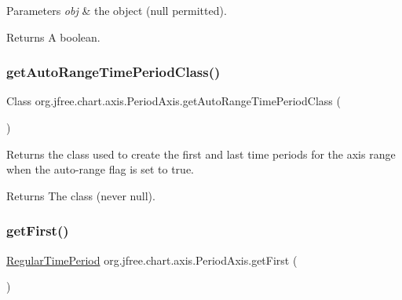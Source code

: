 \begin{DoxyParams}{Parameters}
{\em obj} & the object ({\ttfamily null} permitted).\\
\hline
\end{DoxyParams}
\begin{DoxyReturn}{Returns}
A boolean. 
\end{DoxyReturn}
\mbox{\label{classorg_1_1jfree_1_1chart_1_1axis_1_1_period_axis_abd775d70847623310012a3d2c8e4af31}} 
\subsubsection{\texorpdfstring{get\+Auto\+Range\+Time\+Period\+Class()}{getAutoRangeTimePeriodClass()}}
{\footnotesize\ttfamily Class org.\+jfree.\+chart.\+axis.\+Period\+Axis.\+get\+Auto\+Range\+Time\+Period\+Class (\begin{DoxyParamCaption}{ }\end{DoxyParamCaption})}

Returns the class used to create the first and last time periods for the axis range when the auto-\/range flag is set to {\ttfamily true}.

\begin{DoxyReturn}{Returns}
The class (never {\ttfamily null}). 
\end{DoxyReturn}
\mbox{\label{classorg_1_1jfree_1_1chart_1_1axis_1_1_period_axis_a71641826c0fbb76457131a4c11642b1f}} 
\subsubsection{\texorpdfstring{get\+First()}{getFirst()}}
{\footnotesize\ttfamily \mbox{\hyperlink{classorg_1_1jfree_1_1data_1_1time_1_1_regular_time_period}{Regular\+Time\+Period}} org.\+jfree.\+chart.\+axis.\+Period\+Axis.\+get\+First (\begin{DoxyParamCaption}{ }\end{DoxyParamCaption})}

